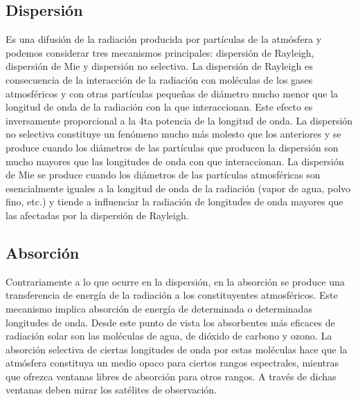 \documentclass{article}
\begin{document}
\subsection{Dispersión}
Es una difusión de la radiación producida por partículas de la atmósfera y podemos  considerar tres mecanismos principales: dispersión de Rayleigh, dispersión de Mie y  dispersión no selectiva. La dispersión de Rayleigh es consecuencia de la interacción de la radiación con moléculas  de los gases atmosféricos y con otras partículas pequeñas de diámetro mucho menor que
la longitud de onda de la radiación con la que interaccionan. Este efecto es inversamente  proporcional a la 4ta potencia de la longitud de onda.
\newline
La dispersión no selectiva constituye un fenómeno mucho más molesto que los anteriores y se produce cuando los diámetros de las partículas que producen la dispersión son mucho mayores que las longitudes de onda con que interaccionan.
\newline
 La dispersión de Mie se produce cuando los diámetros de las partículas atmosféricas son esencialmente iguales a la longitud de onda de la radiación (vapor de agua, polvo fino, etc.) y tiende a influenciar la radiación de longitudes de onda mayores que las afectadas por la dispersión de Rayleigh.

\subsection{Absorción}
Contrariamente a lo que ocurre en la dispersión, en la absorción se produce una transferencia de energía de la radiación a los constituyentes atmosféricos. Este mecanismo implica absorción de energía de determinada o determinadas longitudes de onda. Desde este punto de vista los absorbentes más eficaces de radiación solar son las moléculas de agua, de dióxido de carbono y ozono. La absorción selectiva de ciertas longitudes de onda por estas moléculas hace que la atmósfera constituya un medio opaco para ciertos rangos espectrales, mientras que ofrezca ventanas libres de absorción para otros rangos. A través de dichas ventanas deben mirar los satélites de observación.
\end{document}
